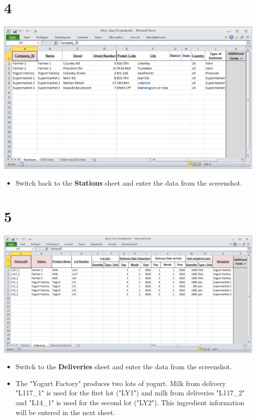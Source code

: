 \documentclass{beamer}
\begin{document}
\section{4}
\begin{frame}
	\begin{center}
  		\includegraphics[height=0.6\textheight]{4.png}
	\end{center}
	\begin{itemize}
		\item Switch back to the \textbf{Stations} sheet and enter the data from the screenshot.
	\end{itemize}
\end{frame}

\section{5}
\begin{frame}
	\begin{center}
  		\includegraphics[height=0.5\textheight]{5.png}
	\end{center}
	\begin{itemize}
		\item Switch to the \textbf{Deliveries} sheet and enter the data from the screenshot.
		\item The "Yogurt Factory" produces two lots of yogurt. Milk from delivery "L117\_1" is used for the first lot ("LY1") and milk from deliveries "L117\_2" and "L14\_1" is used for the second lot ("LY2"). This ingredient information will be entered in the next sheet.
	\end{itemize}
\end{frame}
\end{document}
